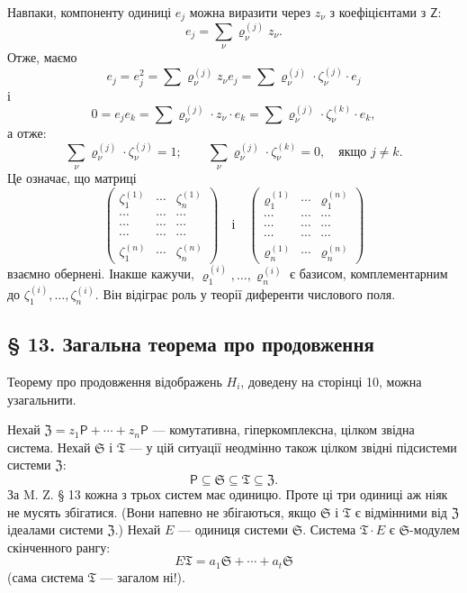 \documentclass[11pt]{article}
\begin{document}
Навпаки, компоненту одиниці \(e_j\) можна виразити через \(z_\nu\) з коефіцієнтами з \(\mathsf Z\):
\[
e_j=\sum_\nu \varrho_\nu^{(j)}z_\nu .
\]
Отже, маємо
\[
e_j=e_j^2=\sum \varrho_\nu^{(j)}z_\nu e_j
=\sum \varrho_\nu^{(j)}\cdot\zeta_\nu^{(j)}\cdot e_j
\]
і
\[
0=e_je_k=\sum \varrho_\nu^{(j)}\cdot z_\nu\cdot e_k
=\sum \varrho_\nu^{(j)}\cdot\zeta_\nu^{(k)}\cdot e_k,
\]
а отже:
\[
\sum_\nu \varrho_\nu^{(j)}\cdot\zeta_\nu^{(j)}=1;
\qquad
\sum_\nu \varrho_\nu^{(j)}\cdot\zeta_\nu^{(k)}=0,\quad
\text{якщо } j\ne k.
\]
Це означає, що матриці
\[
\begin{pmatrix}
\zeta_1^{(1)} & \cdots & \zeta_n^{(1)}\\
\cdots & \cdots & \cdots\\
\cdots & \cdots & \cdots\\
\cdots & \cdots & \cdots\\
\zeta_1^{(n)} & \cdots & \zeta_n^{(n)}
\end{pmatrix}
\quad\text{і}\quad
\begin{pmatrix}
\varrho_1^{(1)} & \cdots & \varrho_1^{(n)}\\
\cdots & \cdots & \cdots\\
\cdots & \cdots & \cdots\\
\cdots & \cdots & \cdots\\
\varrho_n^{(1)} & \cdots & \varrho_n^{(n)}
\end{pmatrix}
\]
взаємно обернені. Інакше кажучи, \(\varrho_1^{(i)},\ldots,\varrho_n^{(i)}\) є базисом, комплементарним до \(\zeta_1^{(i)},\ldots,\zeta_n^{(i)}\). Він відіграє роль у теорії диференти числового поля.

\subsection*{§ 13. Загальна теорема про продовження}\label{der-allgemeine-fortsetzungssatz}

Теорему про продовження відображень \(H_i\), доведену на сторінці 10, можна узагальнити.

Нехай \(\mathfrak Z=z_1\mathsf P+\cdots+z_n\mathsf P\) --- комутативна, гіперкомплексна, цілком звідна система. Нехай \(\mathfrak S\) і \(\mathfrak T\) --- у цій ситуації неодмінно також цілком звідні підсистеми системи \(\mathfrak Z\):
\[
\mathsf P\subseteq\mathfrak S\subseteq\mathfrak T\subseteq\mathfrak Z .
\]
За M. Z. § 13 кожна з трьох систем має одиницю. Проте ці три одиниці аж ніяк не мусять збігатися. (Вони напевно не збігаються, якщо \(\mathfrak S\) і \(\mathfrak T\) є відмінними від \(\mathfrak Z\) ідеалами системи \(\mathfrak Z\).) Нехай \(E\) --- одиниця системи \(\mathfrak S\). Система \(\mathfrak T\cdot E\) є \(\mathfrak S\)-модулем скінченного рангу:
\[
E\mathfrak T=a_1\mathfrak S+\cdots+a_t\mathfrak S
\]
(сама система \(\mathfrak T\) --- загалом ні!).
\end{document}
